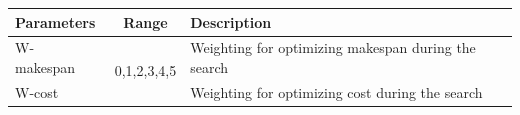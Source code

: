 \documentclass{llncs}
\def\WMAKESPAN{{W-makespan}}
\def\WCOST{{W-cost}}
\begin{document}
\begin{table}[tb!]
\scriptsize
\begin{tabular}{|l|c|l|}
\hline
Parameters 	&	   Range  & 	Description\\					
\hline									
\WMAKESPAN\	&	\multirow{2}{*}{0,1,2,3,4,5} &	Weighting for  optimizing  makespan during the search  \\
\WCOST\ 	&	  &	  Weighting for optimizing cost during the search\\	

\end{tabular}
\end{table}
\end{document}
